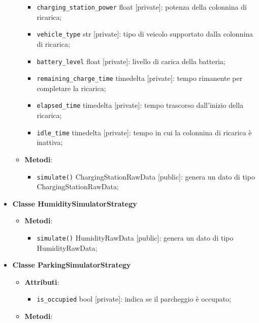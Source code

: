 \begin{itemize}
\begin{itemize}
\begin{itemize}
			            \item \texttt{charging\_station\_power} float [private]: potenza della colonnina di ricarica;
			            \item \texttt{vehicle\_type} str [private]: tipo di veicolo supportato dalla colonnina di ricarica;
			            \item \texttt{battery\_level} float [private]: livello di carica della batteria;
			            \item \texttt{remaining\_charge\_time} timedelta [private]: tempo rimanente per completare la ricarica;
			            \item \texttt{elapsed\_time} timedelta [private]: tempo trascorso dall'inizio della ricarica;
			            \item \texttt{idle\_time} timedelta [private]: tempo in cui la colonnina di ricarica è inattiva;
		            \end{itemize}
		      \item \textbf{Metodi}:
		            \begin{itemize}
			            \item \texttt{simulate()} ChargingStationRawData [public]: genera un dato di
			                  tipo \\ChargingStationRawData;
		            \end{itemize}
	      \end{itemize}
	\item \textbf{Classe HumiditySimulatorStrategy}
	      \begin{itemize}
		      \item \textbf{Metodi}:
		            \begin{itemize}
			            \item \texttt{simulate()} HumidityRawData [public]: genera un dato di tipo HumidityRawData;
		            \end{itemize}
	      \end{itemize}
	\item \textbf{Classe ParkingSimulatorStrategy}
	      \begin{itemize}
		      \item \textbf{Attributi}:
		            \begin{itemize}
			            \item \texttt{is\_occupied} bool [private]: indica se il parcheggio è occupato;
		            \end{itemize}
		      \item \textbf{Metodi}:

\end{itemize}
\end{itemize}
